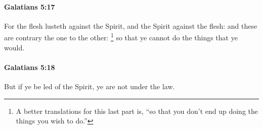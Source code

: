		\paragraph{Galatians 5:17} %
			\label{GALATIANS-5-17}

			For the flesh lusteth against the Spirit, and the Spirit against the flesh: and these are contrary the one to the other:
				\footnote{%
					A better translations for this last part is, ``so that you don't end up doing the things you wish to do.''
					}%
			so that ye cannot do the things that ye would.

			\begin{framed}
			\scriptsize
				\begin{compactdesc}
					\item[SBLG] 
				\end{compactdesc}
			\end{framed}

		\paragraph{Galatians 5:18} %
			\label{GALATIANS-5-18}

			But if ye be led of the Spirit, ye are not under the law.

